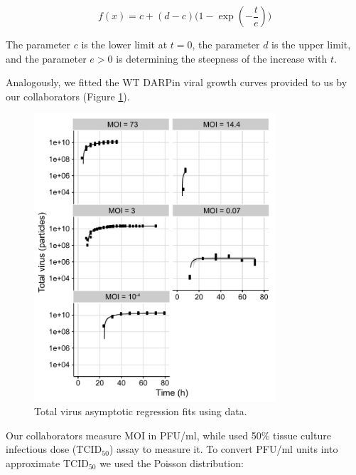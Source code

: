 \begin{equation}
f(x) = c + (d-c)\big(1-\exp(-\frac{t}{e})\big)
\label{eq:ar3function}
\end{equation}

The parameter $c$ is the lower limit at $t=0$, the parameter $d$ is the upper limit, and the parameter $e>0$ is determining the steepness of the increase with $t$.

Analogously, we fitted the WT DARPin viral growth curves provided to us by our collaborators \cite{DarpinData} (Figure \ref{figure:totalVirusFits}).

\begin{figure}
\begin{center}
\includegraphics[width=0.8\textwidth, trim={0cm 0cm 0cm 0cm}, clip]{D_chapters/3_DARPinModels/fittingTotalVirus.pdf}
\caption[Total virus asymptotic regression fits]{Total virus asymptotic regression fits using \cite{rudiger2019multiscale, DarpinData} data.}
\label{figure:totalVirusFits}
\end{center}
\end{figure}

Our collaborators measure MOI in PFU/ml, while \cite{rudiger2019multiscale} used 50\% tissue culture infectious dose (TCID$_{50}$) assay to measure it. To convert PFU/ml units into approximate TCID$_{50}$ we used the Poisson distribution:

